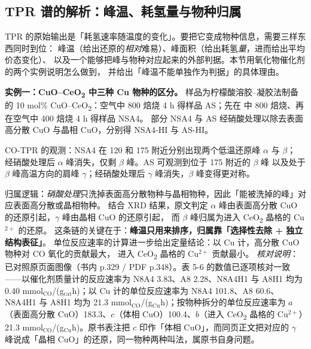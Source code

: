 \subsection{TPR 谱的解析：峰温、耗氢量与物种归属}
\label{sec:ch05b-tpr}

\begin{probout}
TPR 的原始输出是「耗氢速率随温度的变化」。要把它变成物种信息，需要三样东西同时到位：
峰温（给出还原的\emph{相对}难易）、峰面积（给出耗氢\emph{量}，进而给出平均价态变化）、
以及一个能够把峰与物种对应起来的外部判据。本节用氧化物催化剂的两个实例说明怎么做到，
并给出「峰温不能单独作为判据」的具体理由。
\end{probout}

\begin{dataflow}
\textbf{实例一：CuO--CeO\textsubscript{2} 中三种 Cu 物种的区分。}
样品为柠檬酸溶胶--凝胶法制备的 10 mol\% CuO--CeO\textsubscript{2}：空气中 \qty{800}{\degC} 焙烧 4 h
得样品 AS；先在  中 \qty{800}{\degC} 焙烧、再在空气中 \qty{400}{\degC} 焙烧 4 h 得样品 NSA4。
部分 NSA4 与 AS 经硝酸处理以除去表面高分散 CuO 与晶相 CuO，分别得 NSA4-HI 与 AS-HI。

CO-TPR 的观测：NSA4 在 \qty{120}{\degC} 和 \qty{175}{\degC} 附近分别出现两个低温还原峰 $\alpha$ 与 $\beta$；
经硝酸处理后 $\alpha$ 峰消失，仅剩 $\beta$ 峰。AS 可观测到位于 \qty{175}{\degC} 附近的 $\beta$ 峰
以及处于 $\beta$ 峰高温方向的肩峰 $\gamma$；经硝酸处理后 $\gamma$ 峰消失，$\beta$ 峰变得更对称。

归属逻辑：\emph{硝酸处理}只洗掉表面高分散物种与晶相物种，因此「能被洗掉的峰」对应表面高分散或晶相物种。
结合 XRD 结果，原文判定 $\alpha$ 峰由表面高分散 CuO 的还原引起，$\gamma$ 峰由晶相 CuO 的还原引起，
而 $\beta$ 峰归属为进入 CeO\textsubscript{2} 晶格的 Cu$^{2+}$ 的还原。
这条链的关键在于：\textbf{峰温只用来排序，归属靠「选择性去除 + 独立结构表征」}。
单位反应速率的计算进一步给出定量结论：以 Cu 计，高分散 CuO 物种对 CO 氧化的贡献最大，
进入 CeO\textsubscript{2} 晶格的 Cu$^{2+}$ 贡献最小。
\emph{核对说明}：已对照原页面图像（书内 p.329 / PDF p.348）。表 5-6 的数值已逐项核对一致——以催化剂质量计的反应速率为 N8A4 3.83、A8 2.28、N8A4H1 与 A8H1 均为 0.40 mmol$_{\mathrm{CO}}$/(g$_{\mathrm{cat}}$\textperiodcentered h)；以 Cu 计的单位反应速率为 N8A4 101.8、A8 60.6、N8A4H1 与 A8H1 均为 21.3 mmol$_{\mathrm{CO}}$/(g$_{\mathrm{Cu}}$\textperiodcentered h)；按物种拆分的单位反应速率为 $a$（表面高分散 CuO）183.3、$c$（体相 CuO）100.4、$b$（进入 CeO\textsubscript{2} 晶格的 Cu$^{2+}$）21.3 mmol$_{\mathrm{CO}}$/(g$_{\mathrm{Cu}}$\textperiodcentered h)。原书表注把 $c$ 印作「体相 CuO」，而同页正文把对应的 $\gamma$ 峰说成「晶相 CuO」的还原，同一物种两种叫法，属原书自身问题。


\end{dataflow}
